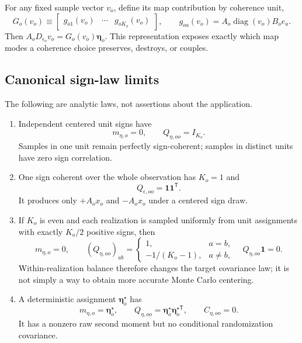 \documentclass[11pt]{article}
\newcommand{\diag}{\operatorname{diag}}
\newcommand{\one}{\bm{1}}
\newcommand{\etaV}{\boldsymbol{\eta}}
\begin{document}
For any fixed sample vector $v_o$, define its map contribution by coherence
unit,
\begin{equation}
  G_o(v_o)\equiv
  \begin{bmatrix}g_{o1}(v_o)&\cdots&g_{oK_o}(v_o)\end{bmatrix},
  \qquad
  g_{oa}(v_o)=A_o\diag(v_o)B_oe_a .
  \label{eq:unit-map-contributions}
\end{equation}
Then $A_oD_{\epsilon_o}v_o=G_o(v_o)\etaV_o$.  This representation exposes
exactly which map modes a coherence choice preserves, destroys, or couples.

\subsection{Canonical sign-law limits}

The following are analytic laws, not assertions about the application.

\begin{enumerate}
\item Independent centered unit signs have
\begin{equation}
  m_{\eta,o}=0,\qquad Q_{\eta,oo}=I_{K_o}.
  \label{eq:independent-unit-law}
\end{equation}
Samples in one unit remain perfectly sign-coherent; samples in distinct units
have zero sign correlation.

\item One sign coherent over the whole observation has $K_o=1$ and
\begin{equation}
  Q_{\epsilon,oo}=\one\one^{\mathsf T}.
  \label{eq:global-coherent-law}
\end{equation}
It produces only $+A_ox_o$ and $-A_ox_o$ under a centered sign draw.

\item If $K_o$ is even and each realization is sampled uniformly from unit
assignments with exactly $K_o/2$ positive signs, then
\begin{equation}
  m_{\eta,o}=0,\qquad
  (Q_{\eta,oo})_{ab}=
  \begin{cases}
    1,&a=b,\\
    -1/(K_o-1),&a\ne b,
  \end{cases}
  \quad
  Q_{\eta,oo}\one=0.
  \label{eq:within-realization-balance}
\end{equation}
Within-realization balance therefore changes the target covariance law; it is
not simply a way to obtain more accurate Monte Carlo centering.

\item A deterministic assignment $\etaV_o^\star$ has
\begin{equation}
  m_{\eta,o}=\etaV_o^\star,\qquad
  Q_{\eta,oo}=\etaV_o^\star\etaV_o^{\star\mathsf T},
  \qquad C_{\eta,oo}=0.
  \label{eq:deterministic-sign-law}
\end{equation}
It has a nonzero raw second moment but no conditional randomization covariance.
\end{enumerate}
\end{document}
